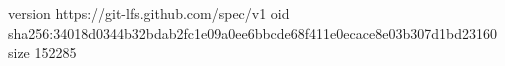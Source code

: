 version https://git-lfs.github.com/spec/v1
oid sha256:34018d0344b32bdab2fc1e09a0ee6bbcde68f411e0ecace8e03b307d1bd23160
size 152285
